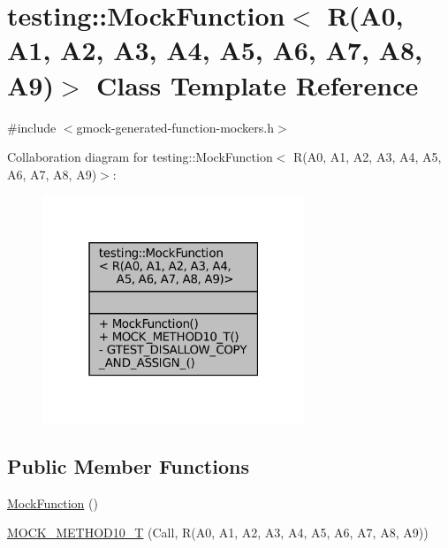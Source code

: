 \hypertarget{classtesting_1_1MockFunction_3_01R_07A0_00_01A1_00_01A2_00_01A3_00_01A4_00_01A5_00_01A6_00_01A7_00_01A8_00_01A9_08_4}{}\section{testing\+:\+:Mock\+Function$<$ R(A0, A1, A2, A3, A4, A5, A6, A7, A8, A9)$>$ Class Template Reference}
\label{classtesting_1_1MockFunction_3_01R_07A0_00_01A1_00_01A2_00_01A3_00_01A4_00_01A5_00_01A6_00_01A7_00_01A8_00_01A9_08_4}


{\ttfamily \#include $<$gmock-\/generated-\/function-\/mockers.\+h$>$}



Collaboration diagram for testing\+:\+:Mock\+Function$<$ R(A0, A1, A2, A3, A4, A5, A6, A7, A8, A9)$>$\+:
\nopagebreak
\begin{figure}[H]
\begin{center}
\leavevmode
\includegraphics[width=223pt]{classtesting_1_1MockFunction_3_01R_07A0_00_01A1_00_01A2_00_01A3_00_01A4_00_01A5_00_01A6_00_01A7_c845c93b7198198dad666743f4229814}
\end{center}
\end{figure}
\subsection*{Public Member Functions}
\begin{DoxyCompactItemize}
\item 
\hyperlink{classtesting_1_1MockFunction_3_01R_07A0_00_01A1_00_01A2_00_01A3_00_01A4_00_01A5_00_01A6_00_01A7_00_01A8_00_01A9_08_4_af5faa98b52d5b5032c57022cdf96d21d}{Mock\+Function} ()
\item 
\hyperlink{classtesting_1_1MockFunction_3_01R_07A0_00_01A1_00_01A2_00_01A3_00_01A4_00_01A5_00_01A6_00_01A7_00_01A8_00_01A9_08_4_adb493fcbb4936734eda9cf99b4d0acd0}{M\+O\+C\+K\+\_\+\+M\+E\+T\+H\+O\+D10\+\_\+T} (Call, R(A0, A1, A2, A3, A4, A5, A6, A7, A8, A9))
\end{DoxyCompactItemize}
